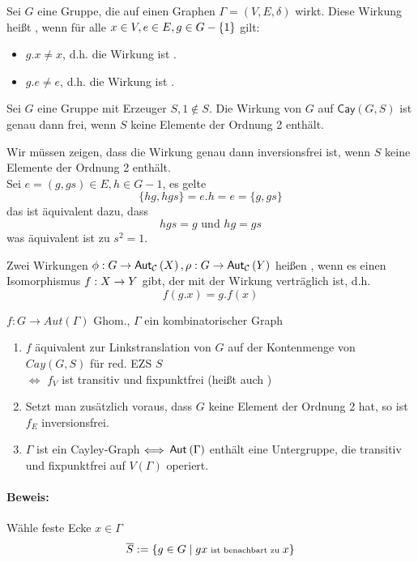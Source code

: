 \documentclass{article}
\newcommand{\Cay}[2]{\textsf{Cay}(#1,#2)}
\renewcommand{\C}{\mathcal{C}}
\begin{document}

Sei $G$ eine Gruppe, die auf einen Graphen $\Gamma = (V,E, \delta)$ wirkt. Diese Wirkung heißt , wenn für alle $x\in V, e \in E, g \in G-\set{1}{}$ gilt:
\begin{itemize}
\item $g.x \neq x$, d.h. die Wirkung ist .
\item $g.e \neq e$, d.h. die Wirkung ist .
\end{itemize}

\Bsp{}

\Satz{}
Sei $G$ eine Gruppe mit Erzeuger $S, 1 \notin S$. Die Wirkung von $G$ auf $\Cay{G}{S}$ ist genau dann frei, wenn $S$ keine Elemente der Ordnung 2 enthält.
\begin{Beweis}{}
Wir müssen zeigen, dass die Wirkung genau dann inversionsfrei ist, wenn $S$ keine Elemente der Ordnung 2 enthält.\\
Sei $e = (g, gs) \in E, h \in G - 1$, es gelte
\[ \{hg, hgs\} = e.h = e = \{g, gs\} \]
das ist äquivalent dazu, dass
\[hgs = g \text{ und } hg = gs \]
was äquivalent ist zu $s^2 = 1$.
\end{Beweis}

Zwei Wirkungen $\phi : G \rightarrow \Aut{\C}{X}, \rho : G \pfeil{} \Aut{\C}{Y}$ heißen , wenn es einen Isomorphismus $f : X \overset{}{\rightarrow} Y$ gibt, der mit der Wirkung verträglich ist, d.h.
\[ f(g.x) = g.f(x) \]

$f : G \rightarrow Aut(\Gamma)$ Ghom., $\Gamma$ ein kombinatorischer Graph
\begin{enumerate}
	\item $f$ äquivalent zur Linkstranslation von $G$ auf der Kontenmenge von $Cay(G,S)$ für red. EZS $S$\\
	$\Longleftrightarrow$ $f_V$ ist transitiv und fixpunktfrei (heißt auch )
	\item Setzt man zusätzlich voraus, dass $G$ keine Element der Ordnung 2 hat, so ist $f_E$ inversionsfrei.
	\item $\Gamma$ ist ein Cayley-Graph $\overset{}{\Longleftrightarrow}$ $\textsf{Aut}_{}\left(\Gamma\right)$ enthält eine Untergruppe, die transitiv und fixpunktfrei auf $V(\Gamma)$ operiert.
\end{enumerate}

\paragraph{Beweis:}
Wähle feste Ecke $x\in \Gamma$\\
\[\overline{S} := \set{g\in G}{gx \text{ ist benachbart zu } x}\]
\end{document}
